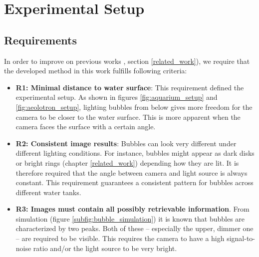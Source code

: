 \chapter{Experimental Setup}\label{experimental_setup}
	\section{Requirements}\label{requirements}
		In order to improve on previous works \citet{Leonie}, section \ref{related_work}), we require that the developed method in this work fulfills following criteria:
	\begin{itemize}
		\item \textbf{R1: Minimal distance to water surface}: This requirement defined the experimental setup. As shown in figures \ref{fig:aquarium_setup} and \ref{fig:aeolotron_setup}, lighting bubbles from below gives more freedom for the camera to be closer to the water surface. This is more apparent when the camera faces the surface with a certain angle. 
		\item \textbf{R2: Consistent image results}: Bubbles can look very different under different lighting conditions. For instance, bubbles might appear as dark disks or bright rings (chapter \ref{related_work}) depending how they are lit. It is therefore required that the angle between camera and light source is always constant. This requirement guarantees a consistent pattern for bubbles across different water tanks.
		\item \textbf{R3: Images must contain all possibly retrievable information}. From simulation (figure \ref{subfig:bubble_simulation}) it is known that bubbles are characterized by two peaks. Both of these – especially the upper, dimmer one – are required to be visible. This requires the camera to have a high signal-to-noise ratio and/or the light source to be very bright. 
	\end{itemize}	
		
